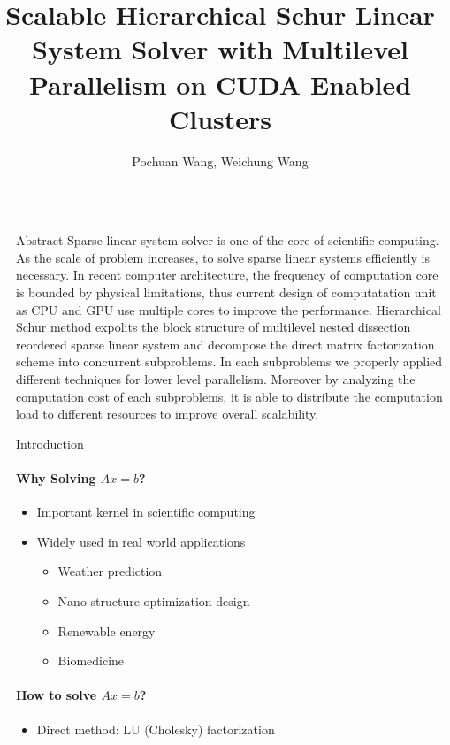 \documentclass[final]{beamer}
\title{Scalable Hierarchical Schur Linear System Solver with Multilevel Parallelism on CUDA Enabled Clusters}
\author{Pochuan Wang, Weichung Wang}
\institute{Institute of Applied Mathematical Sciences, National Taiwan University}
\newlength{\sepwid}
\newlength{\onecolwid}
\begin{document}
  \begin{frame}[t]
    \begin{columns}[t]
      \begin{column}{\sepwid}\end{column}
        \begin{column}{\onecolwid}
        \begin{block}{Abstract}
          Sparse linear system solver is one of the core of scientific computing.
          As the scale of problem increases, to solve sparse linear systems efficiently
          is necessary.
          In recent computer architecture, the frequency of computation core is bounded
          by physical limitations, thus current design of computatation unit as CPU and
          GPU use multiple cores to improve the performance.
          Hierarchical Schur method expolits the block structure of multilevel nested
          dissection reordered sparse linear system and decompose the direct matrix
          factorization scheme into concurrent subproblems. In each subproblems we
          properly applied different techniques for lower level parallelism. Moreover
          by analyzing the computation cost of each subproblems, it is able to
          distribute the computation load to different resources to improve overall
          scalability.
        \end{block}
        \begin{block}{Introduction}
          \paragraph{\textbf{Why Solving $Ax=b$?}}
          \begin{itemize}
            \item Important kernel in scientific computing
            \item Widely used in real world applications
            \begin{itemize}
              \item Weather prediction
              \item Nano-structure optimization design 
              \item Renewable energy
              \item Biomedicine
            \end{itemize}
          \end{itemize}
          \paragraph{\textbf{How to solve $Ax=b$?}}
          \begin{itemize}
            \item Direct method: LU (Cholesky) factorization
          \end{itemize}

\end{block}
\end{column}
\end{columns}
\end{frame}
\end{document}
